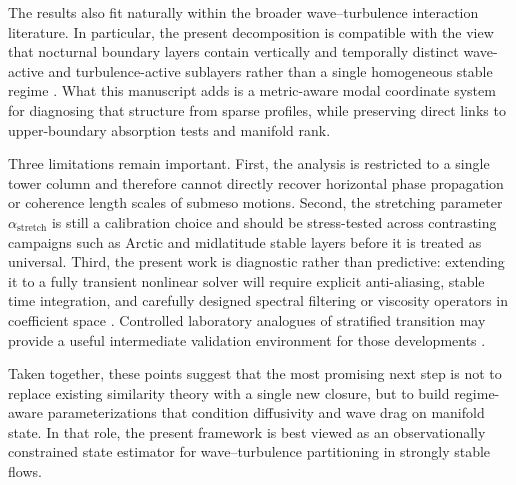 \documentclass[11pt,a4paper]{article}
\begin{document}
The results also fit naturally within the broader wave--turbulence interaction literature. In particular, the present decomposition is compatible with the view that nocturnal boundary layers contain vertically and temporally distinct wave-active and turbulence-active sublayers rather than a single homogeneous stable regime \citep{Sun2015, Barbano2022}. What this manuscript adds is a metric-aware modal coordinate system for diagnosing that structure from sparse profiles, while preserving direct links to upper-boundary absorption tests and manifold rank.

Three limitations remain important. First, the analysis is restricted to a single tower column and therefore cannot directly recover horizontal phase propagation or coherence length scales of submeso motions. Second, the stretching parameter $\alpha_{\mathrm{stretch}}$ is still a calibration choice and should be stress-tested across contrasting campaigns such as Arctic and midlatitude stable layers before it is treated as universal. Third, the present work is diagnostic rather than predictive: extending it to a fully transient nonlinear solver will require explicit anti-aliasing, stable time integration, and carefully designed spectral filtering or viscosity operators in coefficient space \citep{Halila2019, Kaur2023, Pellegrino2023}. Controlled laboratory analogues of stratified transition may provide a useful intermediate validation environment for those developments \citep{Lefauve2025}.

Taken together, these points suggest that the most promising next step is not to replace existing similarity theory with a single new closure, but to build regime-aware parameterizations that condition diffusivity and wave drag on manifold state. In that role, the present framework is best viewed as an observationally constrained state estimator for wave--turbulence partitioning in strongly stable flows.
\end{document}
